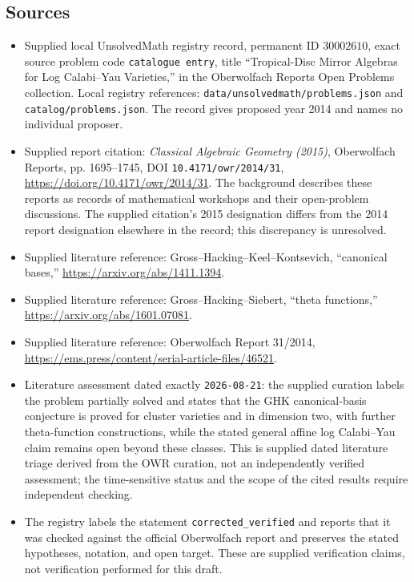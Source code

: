 \documentclass[11pt]{article}
\begin{document}
\subsection{Sources}
\begin{itemize}
\item Supplied local UnsolvedMath registry record, permanent ID \(30002610\), exact source problem code \texttt{catalogue entry}, title ``Tropical-Disc Mirror Algebras for Log Calabi--Yau Varieties,'' in the Oberwolfach Reports Open Problems collection. Local registry references: \texttt{data/unsolvedmath/problems.json} and \texttt{catalog/problems.json}. The record gives proposed year 2014 and names no individual proposer.
\item Supplied report citation: \emph{Classical Algebraic Geometry (2015)}, Oberwolfach Reports, pp. 1695--1745, DOI \texttt{10.4171/owr/2014/31}, \url{https://doi.org/10.4171/owr/2014/31}. The background describes these reports as records of mathematical workshops and their open-problem discussions. The supplied citation's 2015 designation differs from the 2014 report designation elsewhere in the record; this discrepancy is unresolved.
\item Supplied literature reference: Gross--Hacking--Keel--Kontsevich, ``canonical bases,'' \url{https://arxiv.org/abs/1411.1394}.
\item Supplied literature reference: Gross--Hacking--Siebert, ``theta functions,'' \url{https://arxiv.org/abs/1601.07081}.
\item Supplied literature reference: Oberwolfach Report 31/2014, \url{https://ems.press/content/serial-article-files/46521}.
\item Literature assessment dated exactly \texttt{2026-08-21}: the supplied curation labels the problem partially solved and states that the GHK canonical-basis conjecture is proved for cluster varieties and in dimension two, with further theta-function constructions, while the stated general affine log Calabi--Yau claim remains open beyond these classes. This is supplied dated literature triage derived from the OWR curation, not an independently verified assessment; the time-sensitive status and the scope of the cited results require independent checking.
\item The registry labels the statement \texttt{corrected\_verified} and reports that it was checked against the official Oberwolfach report and preserves the stated hypotheses, notation, and open target. These are supplied verification claims, not verification performed for this draft.
\end{itemize}
\end{document}
